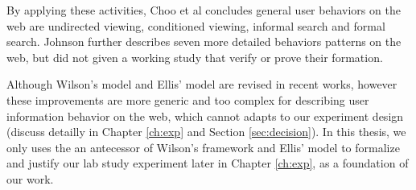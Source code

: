 By applying these activities, Choo et al concludes general user behaviors on the web are
undirected viewing, conditioned viewing, informal search and formal search.
Johnson further describes \cite{johnson2017patterns} seven more detailed behaviors 
patterns on the web, but did not given a working study that verify or prove their formation.

Although Wilson's model and Ellis' model are revised in recent works, however these improvements
are more generic and too complex for describing user information behavior on the web,
which cannot adapts to our experiment design (discuss detailly in Chapter \ref{ch:exp}
and Section \ref{sec:decision}).
In this thesis, we only uses the an antecessor of Wilson's framework \cite{wilson1997information} and 
Ellis' model \cite{ellis1997modelling} to formalize and justify our lab study experiment 
later in Chapter \ref{ch:exp}, as a foundation of our work.

\cleardoublepage